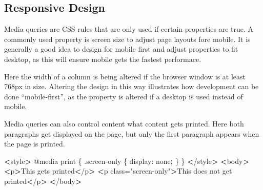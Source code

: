 \documentclass[]{book}
\newenvironment{Shaded}{\begin{snugshade}}{\end{snugshade}}
\newcommand{\ExtensionTok}[1]{#1}
\newcommand{\KeywordTok}[1]{\textcolor[rgb]{0.13,0.29,0.53}{\textbf{#1}}}
\newcommand{\NormalTok}[1]{#1}
\newcommand{\OperatorTok}[1]{\textcolor[rgb]{0.81,0.36,0.00}{\textbf{#1}}}
\newcommand{\StringTok}[1]{\textcolor[rgb]{0.31,0.60,0.02}{#1}}
\begin{document}
\hypertarget{responsive-design}{%
\subsection{Responsive Design}\label{responsive-design}}

Media queries are CSS rules that are only used if certain properties are true. A commonly used property is screen size to adjust page layouts fore mobile. It is generally a good idea to design for mobile first and adjust properties to fit desktop, as this will ensure mobile gets the fastest performace.

Here the width of a column is being altered if the browser window is at least 768px in size. Altering the design in this way illustrates how development can be done ``mobile-first'', as the property is altered if a desktop is used instead of mobile.

\begin{Shaded}
\end{Shaded}

Media queries can also control content what content gets printed. Here both paragraphs get displayed on the page, but only the first paragraph appears when the page is printed.

\begin{Shaded}
\begin{Highlighting}[]
\OperatorTok{<}\ExtensionTok{style}\OperatorTok{>}
    \ExtensionTok{@media}\NormalTok{ print \{}
        \ExtensionTok{.screen-only}\NormalTok{ \{}
            \ExtensionTok{display}\NormalTok{: none}\KeywordTok{;}
\NormalTok{        \}}
\NormalTok{    \}}
\OperatorTok{<}\NormalTok{/}\ExtensionTok{style}\OperatorTok{>}
\OperatorTok{<}\ExtensionTok{body}\OperatorTok{>}
    \OperatorTok{<}\ExtensionTok{p}\OperatorTok{>}\NormalTok{This gets printed}\OperatorTok{<}\NormalTok{/p}\OperatorTok{>}
    \OperatorTok{<}\ExtensionTok{p}\NormalTok{ class=}\StringTok{"screen-only"}\OperatorTok{>}\NormalTok{This does not get printed}\OperatorTok{<}\NormalTok{/p}\OperatorTok{>}
\OperatorTok{<}\NormalTok{/}\ExtensionTok{body}\OperatorTok{>}
\end{Highlighting}
\end{Shaded}
\end{document}
